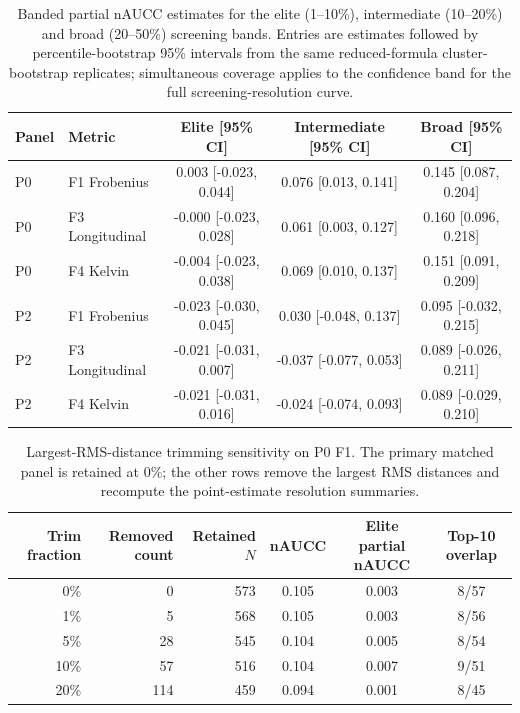 \documentclass[11pt]{article}
\renewcommand{\thetable}{S\arabic{table}}
\begin{document}
\begin{table}[htbp]
\small
\setlength{\tabcolsep}{4pt}
\centering
\caption{Banded partial nAUCC estimates for the elite (1--10\%), intermediate (10--20\%) and broad (20--50\%) screening bands. Entries are estimates followed by percentile-bootstrap 95\% intervals from the same reduced-formula cluster-bootstrap replicates; simultaneous coverage applies to the confidence band for the full screening-resolution curve.}
\label{tab:si_upgrade_bands}
\begin{tabular}{llccc}
\toprule
Panel & Metric & Elite [95\% CI] & Intermediate [95\% CI] & Broad [95\% CI] \\
\midrule
P0 & F1 Frobenius & 0.003 [-0.023, 0.044] & 0.076 [0.013, 0.141] & 0.145 [0.087, 0.204] \\
P0 & F3 Longitudinal & -0.000 [-0.023, 0.028] & 0.061 [0.003, 0.127] & 0.160 [0.096, 0.218] \\
P0 & F4 Kelvin & -0.004 [-0.023, 0.038] & 0.069 [0.010, 0.137] & 0.151 [0.091, 0.209] \\
P2 & F1 Frobenius & -0.023 [-0.030, 0.045] & 0.030 [-0.048, 0.137] & 0.095 [-0.032, 0.215] \\
P2 & F3 Longitudinal & -0.021 [-0.031, 0.007] & -0.037 [-0.077, 0.053] & 0.089 [-0.026, 0.211] \\
P2 & F4 Kelvin & -0.021 [-0.031, 0.016] & -0.024 [-0.074, 0.093] & 0.089 [-0.029, 0.210] \\
\bottomrule
\end{tabular}
\end{table}
\renewcommand{\thetable}{S\arabic{table}}
\renewcommand{\theHtable}{\arabic{table}}


\begin{table}[htbp]
\small
\setlength{\tabcolsep}{5pt}
\centering
\caption{Largest-RMS-distance trimming sensitivity on P0 F1. The primary matched panel is retained at 0\%; the other rows remove the largest RMS distances and recompute the point-estimate resolution summaries.}
\label{tab:si_matching_trim}
\begin{tabular}{r r r c c c}
\toprule
Trim fraction & Removed count & Retained $N$ & nAUCC & Elite partial nAUCC & Top-10 overlap \\
\midrule
0\% & 0 & 573 & 0.105 & 0.003 & 8/57 \\
1\% & 5 & 568 & 0.105 & 0.003 & 8/56 \\
5\% & 28 & 545 & 0.104 & 0.005 & 8/54 \\
10\% & 57 & 516 & 0.104 & 0.007 & 9/51 \\
20\% & 114 & 459 & 0.094 & 0.001 & 8/45 \\
\bottomrule
\end{tabular}
\end{table}
\end{document}
